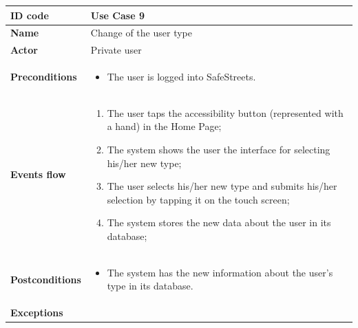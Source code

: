 \documentclass[titlepage]{article}
\begin{document}
\newpage

\begin{longtable}{| p{3 cm} | p{10 cm} |} 
\hline

\textbf{ID code} & Use Case 9 \\ \hline
\textbf{Name} & Change of the user type \\ \hline
\textbf{Actor} & Private user \\ \hline
\textbf{Preconditions} &
\begin{itemize}
\item The user is logged into SafeStreets.
\end{itemize}\\ \hline

\textbf{Events flow} &
\begin{enumerate}
\item The user taps the accessibility button (represented with a hand) in the Home Page;
\item The system shows the user the interface for selecting his/her new type;
\item The user selects his/her new type and submits his/her selection by tapping it on the touch screen;
\item The system stores the new data about the user in its database;
\end{enumerate} \\ \hline

\textbf{Postconditions} &
\begin{itemize}
\item The system has the new information about the user's type in its database.
\end{itemize} \\ \hline

\textbf{Exceptions} & \\ \hline




\end{longtable}


\newpage
\end{document}
